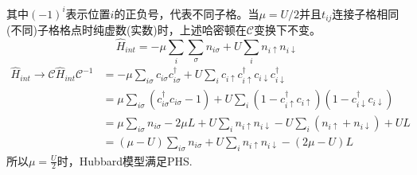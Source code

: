 \documentclass[a4paper]{article}
\numberwithin{equation}{subsection}
\newcommand{\mC}{\mathcal{C}}
\begin{document}
其中$(-1)^i$表示位置$i$的正负号，代表不同子格。当$\mu=U/2$并且$t_{ij}$连接子格相同(不同)子格格点时纯虚数(实数)时，上述哈密顿在$\mC$变换下不变。
\begin{equation*}
    \hat{H}_{int}=-\mu\sum_i\sum_\sigma n_{i\sigma}+U\sum_{i}n_{i\uparrow}n_{i\downarrow}
\end{equation*}
\begin{equation*}
    \begin{split}
        \hat{H}_{int}\rightarrow\mC\hat{H}_{int}\mC^{-1}&=-\mu\sum_{i\sigma}c_{i\sigma}c_{i\sigma}^\dagger+U\sum_{i}c_{i\uparrow}c_{i\uparrow}^\dagger c_{i\downarrow}c_{i\downarrow}^\dagger\\
        &=\mu\sum_{i\sigma}(c_{i\sigma}^\dagger c_{i\sigma}-1)+U\sum_{i}(1-c_{i\uparrow}^\dagger c_{i\uparrow})(1-c_{i\downarrow}^\dagger c_{i\downarrow})\\
        &=\mu\sum_{i\sigma}n_{i\sigma}-2\mu L+U\sum_{i}n_{i\uparrow}n_{i\downarrow}-U\sum_{i}(n_{i\uparrow}+n_{i\downarrow})+UL\\
        &=(\mu-U)\sum_{i\sigma}n_{i\sigma}+U\sum_{i}n_{i\uparrow}n_{i\downarrow}-(2\mu-U)L
    \end{split}
\end{equation*}
所以$\mu=\frac{U}{2}$时，Hubbard模型满足PHS.
\end{document}
